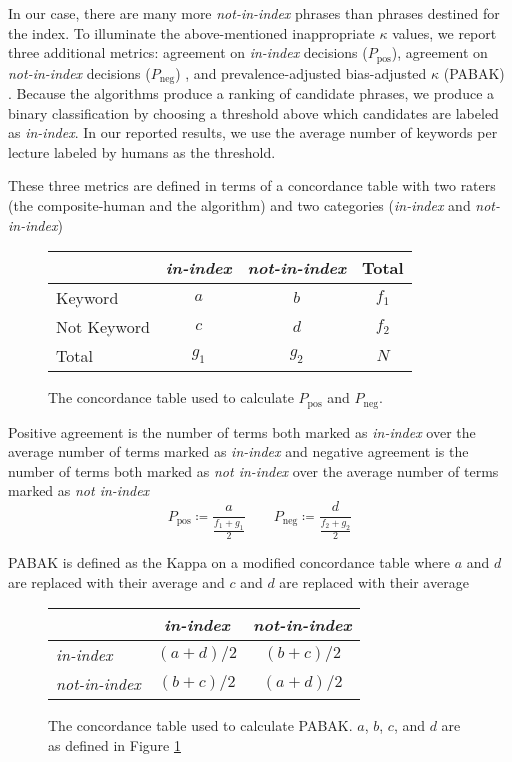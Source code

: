 In our case, there are many more {\em not-in-index} phrases than
phrases destined for the index. To illuminate the above-mentioned
inappropriate $\kappa$ values, we report three additional metrics:
agreement on {\em in-index} decisions ($P_{\text{pos}}$), agreement on
{\em not-in-index} decisions ($P_{\text{neg}}$)
\cite{cicchetti1990high}, and prevalence-adjusted bias-adjusted
$\kappa$ (PABAK) \cite{byrt1993bias}. Because the algorithms produce a
ranking of candidate phrases, we produce a binary classification by
choosing a threshold above which candidates are labeled as {\em
  in-index}. In our reported results, we use the average number of
keywords per lecture labeled by humans as the threshold.

These three metrics are defined in terms of a concordance table with
two raters (the composite-human and the algorithm) and two
categories ({\em in-index} and {\em not-in-index})

\begin{figure}[h]
\caption{The concordance table used to calculate $P_{\text{pos}}$ and $P_{\text{neg}}$. }
\label{fig:concordance_1}
\begin{tabular}{l || c c c}
& {\em in-index} & {\em not-in-index} & Total \\
\hline \hline
Keyword & $a$ & $b$ & $f_1$ \\
Not Keyword & $c$ & $d$ & $f_2$ \\
Total & $g_1$ & $g_2$ & $N$ \\
\end{tabular}
\end{figure}

Positive agreement is the number of terms both marked as {\em
  in-index} over the average number of terms marked as {\em in-index} and
negative agreement is the number of terms both marked as {\em not
  in-index} over the average number of terms marked as {\em not
  in-index}
\begin{equation*}
P_{\text{pos}} \coloneqq \frac{a}{\frac{f_1 + g_1}{2}}
 \qquad P_{\text{neg}} \coloneqq \frac{d}{\frac{f_2 + g_2}{2}}
\end{equation*}

PABAK is defined as the Kappa on a modified concordance table where $a$ and $d$ are replaced with their average and $c$ and $d$ are replaced with their average

\begin{figure}[h]
\caption{The concordance table used to calculate PABAK. $a$, $b$, $c$, and $d$ are as defined in Figure \ref{fig:concordance_1}}
\begin{tabular}{l || c c }
& {\em in-index} & {\em not-in-index} \\
\hline \hline
{\em in-index} & $(a + d) / 2$ & $(b + c) / 2$ \\
{\em not-in-index} & $(b + c) / 2$ & $(a + d) / 2$ \\
\end{tabular}
\end{figure}

